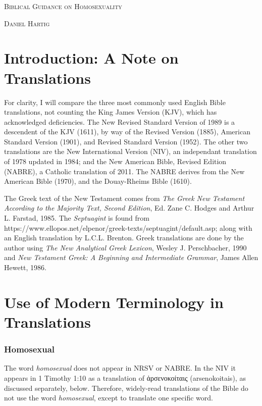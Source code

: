 \documentclass[10pt]{article}
\begin{document}
\begin{titlepage}\centering
\null\vskip 2in
{\scshape\huge Biblical Guidance on Homosexuality \par}
\vfill
{\scshape\large Daniel Hartig \par}
\vfill
\end{titlepage}
\singlespace
\section*{Introduction: A Note on Translations}

For clarity, I will compare the three most commonly used English Bible translations, not counting the King James Version (KJV), which has acknowledged deficiencies. The New Revised Standard Version of 1989 is a descendent of the KJV (1611), by way of the Revised Version (1885), American Standard Version (1901), and Revised Standard Version (1952). The other two translations are the New International Version (NIV), an independant translation of 1978 updated in 1984; and the New American Bible, Revised Edition (NABRE), a Catholic translation of 2011. The NABRE derives from the New American Bible (1970), and the Douay-Rheims Bible (1610). 

The Greek text of the New Testament comes from \textit{The Greek New Testament According to the Majority Text, Second Edition}, Ed. Zane C. Hodges and Arthur L. Farstad, 1985. The \textit{Septuagint} is found from https://www.ellopos.net/elpenor/greek-texts/septuagint/default.asp; along with an English translation by L.C.L. Brenton. Greek translations are done by the author using \textit{The New Analytical Greek Lexicon}, Wesley J. Perschbacher, 1990 and \textit{New Testament Greek: A Beginning and Intermediate Grammar}, James Allen Hewett, 1986.


\section*{Use of Modern Terminology in Translations}

\subsubsection*{Homosexual}

The word \textit{homosexual} does not appear in NRSV or NABRE. In the NIV it appears in 1 Timothy 1:10 as a translation of {\textgreekfont ἀρσενοκοίταις} (arsenokoitais), as discussed separately, below. Therefore, widely-read translations of the Bible do not use the word \textit{homosexual}, except to translate one specific word.
\end{document}
